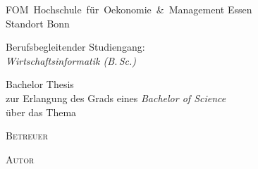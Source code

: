 %

\begin{titlepage}
    \begin{flushleft}
        { %
            \rmfamily
            {
            FOM~Hochschule~für~Oekonomie~\&~Management Essen\\
            Standort Bonn}
        }
        
        \vspace{0.5cm}

        {
            \rmfamily
            Berufsbegleitender Studiengang:\\
            \textit{Wirtschaftsinformatik (B.\,Sc.)}
        }

        \vspace{5.0cm}
        
        {
            \rmfamily
            Bachelor Thesis\\
            zur Erlangung des Grads eines \textit{Bachelor of Science}\\
            über das Thema\\
        }

        \vspace{1.0cm}
        
        {
            \LARGE
            \fancyheadline{\texplatetitle}
        }
        
        \vfill
        

        \begin{multicols}{2}
            \footnotesize
            \rmfamily

            \textsc{Betreuer}\\
            \texplatesupervisor

            \vspace{0.3cm}

            \textsc{Autor}\\
            \texplateauthor


\end{multicols}
\end{flushleft}
\end{titlepage}
